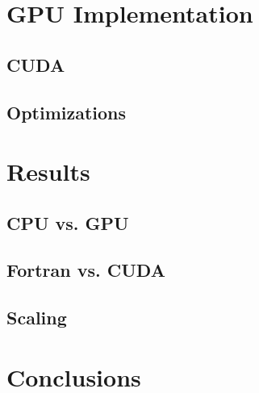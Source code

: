 \documentclass[a4paper,11pt]{kth-mag}
\begin{document}
\chapter{GPU Implementation}
\section{CUDA}
\section{Optimizations}

\chapter{Results}
\section{CPU vs. GPU}
\section{Fortran vs. CUDA}
\section{Scaling}

\chapter{Conclusions}

\appendix
\addappheadtotoc
\end{document}
